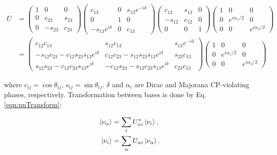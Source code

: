 \begin{equation}
\begin{aligned}
U &= \begin{pmatrix}
1 & 0 & 0 \\
0 & c_{23} & s_{23} \\
0 & -s_{23} & c_{23} \end{pmatrix}
\begin{pmatrix}
c_{13} & 0 & s_{13} e^{-i \delta} \\
0 & 1 & 0 \\
-s_{13} e^{i \delta} & 0 & c_{13} \end{pmatrix}
\begin{pmatrix}
c_{12} & s_{12} & 0 \\
-s_{12} & c_{12} & 0 \\
0 & 0 & 1 \end{pmatrix}
\begin{pmatrix}
1 & 0 & 0 \\
0 & e^{i \alpha_{1}/2} & 0 \\
0 & 0 & e^{i \alpha_{2}/2} \end{pmatrix} \\
& = \begin{pmatrix}
c_{12} c_{13} & s_{12} c_{13} & s_{13} e^{-i \delta} \\
-s_{12} c_{23} - c_{12} s_{23} s_{13} e^{i \delta} & c_{12} c_{23} - s_{12} s_{23} s_{13} e^{i \delta} & s_{23} c_{13} \\
s_{12} s_{23} - c_{12} c_{23} s_{13} e^{i \delta} & -c_{12} s_{23} - s_{12} c_{23} s_{13} e^{i \delta} & c_{23} c_{13} \end{pmatrix}
\begin{pmatrix}
1 & 0 & 0 \\
0 & e^{i \alpha_{1}/2} & 0 \\
0 & 0 & e^{i \alpha_{2}/2} \end{pmatrix}
\end{aligned}
\label{eqn:umatrix}
\end{equation}

\noindent
where $c_{ij} = \cos \theta_{ij}$, $s_{ij} = \sin \theta_{ij}$.  $\delta$  and $\alpha_{i}$ are Dirac and Majorana CP-violating phases, respectively.  Transformation between bases is done by Eq. \ref{eqn:nuTransform}:

\begin{equation}
\begin{aligned}
\ket{\nu_{\alpha}} &= \sum\limits_{i} U^{*}_{\alpha i} \ket{\nu_{i}},\\
\ket{\nu_{i}} &= \sum\limits_{\alpha} U_{\alpha i} \ket{\nu_{\alpha}}.
\end{aligned}
\label{eqn:nuTransform}
\end{equation}

